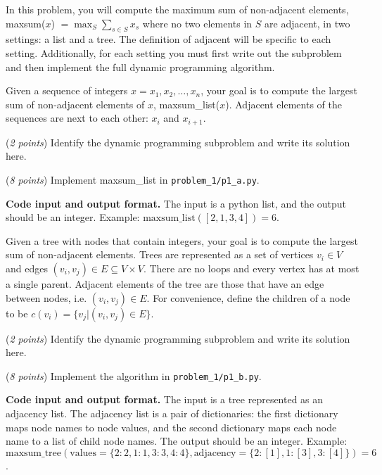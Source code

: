 \documentclass{hw}
\newcommand{\io}{\textbf{Code input and output format.} }
\begin{document}
\newpage



\begin{problem}
In this problem, you will compute the maximum sum of non-adjacent elements,
maxsum($x$) $= \max_S \sum_{s \in S} x_s$ where no two elements in $S$ are adjacent, in two settings:
a list and a tree.
The definition of adjacent will be specific to each setting.
Additionally, for each setting you must first write out the subproblem
and then implement the full dynamic programming algorithm.

\begin{subproblem}
Given a sequence of integers $ x = x_1,x_2,\ldots,x_n $,
your goal is to compute the largest sum of non-adjacent elements of $x$,
maxsum\_list($x$).
Adjacent elements of the sequences are next to each other: $x_i$ and $x_{i+1}$.

(\textit{2 points}) Identify the dynamic programming subproblem and write its solution here.

(\textit{8 points}) Implement maxsum\_list in \texttt{problem\_1/p1\_a.py}.
\end{subproblem}

\io The input is a python list, and the output should be an integer.
Example: $\text{maxsum\_list}([2,1,3,4]) = 6$.

\begin{subproblem}
Given a tree with nodes that contain integers,
your goal is to compute the largest sum of non-adjacent elements.
Trees are represented as a set of vertices
$v_i \in V$ and edges $(v_i, v_j) \in E \subseteq V\times V$.
There are no loops and every vertex has at most a single parent.
Adjacent elements of the tree are those that have an edge between nodes, i.e. $(v_i,v_j)\in E$.
For convenience, define the children of a node to be $c(v_i) = \{v_j | (v_i,v_j)\in E\}$.

(\textit{2 points}) Identify the dynamic programming subproblem and write its solution here.

(\textit{8 points}) Implement the algorithm in \texttt{problem\_1/p1\_b.py}.
\end{subproblem}

\io The input is a tree represented as an adjacency list.
The adjacency list is a pair of dictionaries:
the first dictionary maps node names to node values,
and the second dictionary maps each node name to a list of
child node names.
The output should be an integer.
Example: $\text{maxsum\_tree}(\text{values} = \{2: 2, 1:1, 3:3, 4:4\}, \text{adjacency}=\{2: [1], 1: [3], 3: [4]\}) = 6$.


\end{problem}
\end{document}
